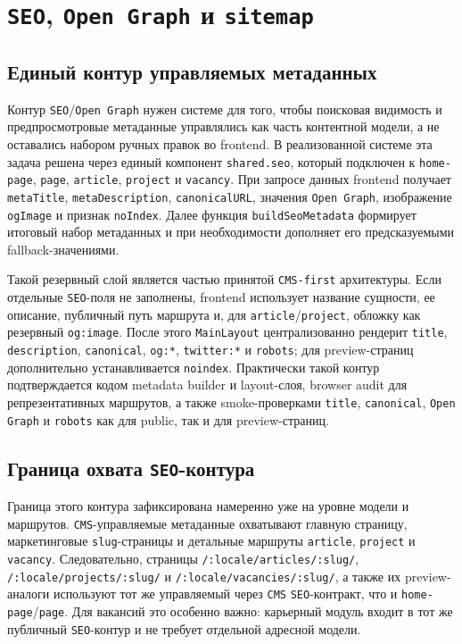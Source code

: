 \section{\texttt{SEO}, \texttt{Open Graph} и \texttt{sitemap}}

\subsection{Единый контур управляемых метаданных}

Контур \texttt{SEO}/\texttt{Open Graph} нужен системе для того, чтобы поисковая
видимость и предпросмотровые метаданные управлялись как часть контентной модели, а не
оставались набором ручных правок во frontend. В реализованной системе эта задача решена
через единый компонент \texttt{shared.seo}, который подключен к \texttt{home-page},
\texttt{page}, \texttt{article}, \texttt{project} и \texttt{vacancy}. При запросе данных
frontend получает \texttt{metaTitle}, \texttt{metaDescription},
\texttt{canonicalURL}, значения \texttt{Open Graph}, изображение \texttt{ogImage} и
признак \texttt{noIndex}. Далее функция \texttt{buildSeoMetadata} формирует итоговый
набор метаданных и при необходимости дополняет его предсказуемыми fallback-значениями.

Такой резервный слой является частью принятой \texttt{CMS-first} архитектуры. Если
отдельные \texttt{SEO}-поля не заполнены, frontend использует название сущности, ее
описание, публичный путь маршрута и, для \texttt{article}/\texttt{project}, обложку как
резервный \texttt{og:image}. После этого \texttt{MainLayout} централизованно рендерит
\texttt{title}, \texttt{description}, \texttt{canonical}, \texttt{og:*},
\texttt{twitter:*} и \texttt{robots}; для preview-страниц дополнительно устанавливается
\texttt{noindex}. Практически такой контур подтверждается кодом metadata builder и
layout-слоя, browser audit для репрезентативных маршрутов, а также smoke-проверками
\texttt{title}, \texttt{canonical}, \texttt{Open Graph} и \texttt{robots} как для
public, так и для preview-страниц.

\subsection{Граница охвата \texttt{SEO}-контура}

Граница этого контура зафиксирована намеренно уже на уровне модели и маршрутов.
\texttt{CMS}-управляемые метаданные охватывают главную страницу, маркетинговые
\texttt{slug}-страницы и детальные маршруты \texttt{article}, \texttt{project} и
\texttt{vacancy}. Следовательно, страницы \texttt{/:locale/articles/:slug/},
\texttt{/:locale/projects/:slug/} и \texttt{/:locale/vacancies/:slug/}, а также их
preview-аналоги
используют тот же управляемый через \texttt{CMS} \texttt{SEO}-контракт, что и
\texttt{home-page}/\texttt{page}. Для вакансий это особенно важно: карьерный модуль
входит в тот же публичный \texttt{SEO}-контур и не требует отдельной адресной модели.

